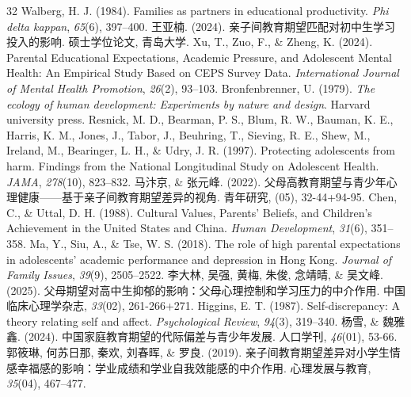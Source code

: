 \documentclass[zihao = -4, linespread = 1.5]{article}
\newcommand{\itsongti}[1]{{\JiangChengXieSongTi#1}}
\begin{document}
\begin{thebibliography}{32}
     Walberg, H. J. (1984). Families as partners in educational productivity. \textit{Phi delta kappan}, \textit{65}(6), 397--400.
     王亚楠. (2024). 亲子间教育期望匹配对初中生学习投入的影响. 硕士学位论文, 青岛大学.
     Xu, T., Zuo, F., \& Zheng, K. (2024). Parental Educational Expectations, Academic Pressure, and Adolescent Mental Health: An Empirical Study Based on CEPS Survey Data. \textit{International Journal of Mental Health Promotion}, \textit{26}(2), 93--103.
     Bronfenbrenner, U. (1979). \textit{The ecology of human development: Experiments by nature and design}. Harvard university press.
     Resnick, M. D., Bearman, P. S., Blum, R. W., Bauman, K. E., Harris, K. M., Jones, J., Tabor, J., Beuhring, T., Sieving, R. E., Shew, M., Ireland, M., Bearinger, L. H., \& Udry, J. R. (1997). Protecting adolescents from harm. Findings from the National Longitudinal Study on Adolescent Health. \textit{JAMA}, \textit{278}(10), 823--832.
     马汴京, \& 张元峰. (2022). 父母高教育期望与青少年心理健康——基于亲子间教育期望差异的视角. \itsongti{青年研究}, (05), 32-44+94-95.
     Chen, C., \& Uttal, D. H. (1988). Cultural Values, Parents' Beliefs, and Children's Achievement in the United States and China. \textit{Human Development}, \textit{31}(6), 351--358.
     Ma, Y., Siu, A., \& Tse, W. S. (2018). The role of high parental expectations in adolescents' academic performance and depression in Hong Kong. \textit{Journal of Family Issues}, \textit{39}(9), 2505--2522.
     李大林, 吴强, 黄梅, 朱俊, 念靖晴, \& 吴文峰. (2025). 父母期望对高中生抑郁的影响：父母心理控制和学习压力的中介作用. \itsongti{中国临床心理学杂志}, \textit{33}(02), 261-266+271.
     Higgins, E. T. (1987). Self-discrepancy: A theory relating self and affect. \textit{Psychological Review}, \textit{94}(3), 319--340.
     杨雪, \& 魏雅鑫. (2024). 中国家庭教育期望的代际偏差与青少年发展. \itsongti{人口学刊}, \textit{46}(01), 53-66.
     郭筱琳, 何苏日那, 秦欢, 刘春晖, \& 罗良. (2019). 亲子间教育期望差异对小学生情感幸福感的影响：学业成绩和学业自我效能感的中介作用. \itsongti{心理发展与教育}, \textit{35}(04), 467--477.

\end{thebibliography}
\end{document}
